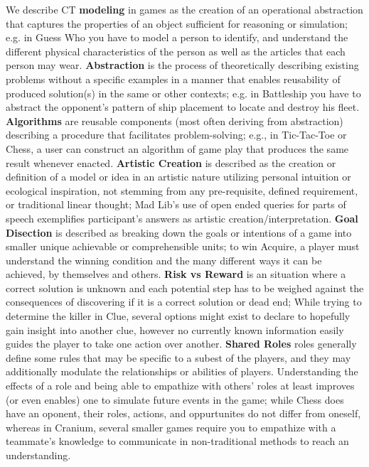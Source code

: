 \documentclass{acm_proc_article-sp}
\begin{document}
We describe CT \textbf{modeling} in games as the creation of an operational abstraction that captures the properties of an object sufficient for reasoning or simulation; e.g. in Guess Who you have to model a person to identify, and understand the different physical characteristics of the person as well as the articles that each person may wear.
\textbf{Abstraction} is the process of theoretically describing existing problems without a specific examples in a manner that enables reusability of produced solution(s) in the same or other contexts; e.g. in Battleship you have to abstract the opponent's pattern of ship placement to locate and destroy his fleet.
\textbf{Algorithms} are reusable components (most often deriving from abstraction) describing a procedure that facilitates problem-solving; e.g., in Tic-Tac-Toe or Chess, a user can construct an algorithm of game play that produces the same result whenever enacted.
\textbf{Artistic Creation} is described as the creation or definition of a model or idea in an artistic nature utilizing personal intuition or ecological inspiration, not stemming from any pre-requisite, defined requirement, or traditional linear thought; Mad Lib's use of open ended queries for parts of speech exemplifies participant's answers as artistic creation/interpretation.
\textbf{Goal Disection} is described as breaking down the goals or intentions of a game into smaller unique achievable or comprehensible units; to win Acquire, a player must understand the winning condition and the many different ways it can be achieved, by themselves and others.
\textbf{Risk vs Reward} is an situation where a correct solution is unknown and each potential step has to be weighed against the consequences of discovering if it is a correct solution or dead end; While trying to determine the killer in Clue, several options might exist to declare to hopefully gain insight into another clue, however no currently known information easily guides the player to take one action over another.
\textbf{Shared Roles} roles generally define some rules that may be specific to a subest of the players, and they may additionally modulate the relationships or abilities of players.
Understanding the effects of a role and being able to empathize with others' roles at least improves (or even enables) one to simulate future events in the game; while Chess does have an oponent, their roles, actions, and oppurtunites do not differ from oneself, whereas in Cranium, several smaller games require you to empathize with a teammate's knowledge to communicate in non-traditional methods to reach an understanding.
\end{document}
